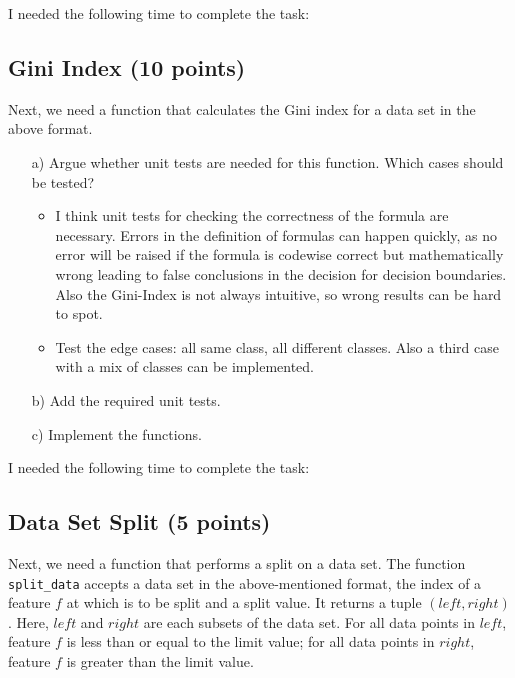 \documentclass{article}
\begin{document}
I needed the following time to complete the task:

\subsection{Gini Index (10 points)}

Next, we need a function that calculates the Gini index for a data set in the above format. 

\begin{enumerate}

\item[a)] Argue whether unit tests are needed for this function. Which cases should be tested?
\begin{itemize}
    \item I think unit tests for checking the correctness of the formula are necessary. Errors in the definition of formulas can happen quickly, as no error will be raised if the formula is codewise correct but mathematically wrong leading to false conclusions in the decision for decision boundaries.
    Also the Gini-Index is not always intuitive, so wrong results can be hard to spot. 
    \item Test the edge cases: all same class, all different classes. Also a third case with a mix of classes can be implemented.
\end{itemize}

\item[b)] Add the required unit tests.

\item[c)] Implement the functions.

\end{enumerate}

I needed the following time to complete the task:

\subsection{Data Set Split (5 points)}

Next, we need a function that performs a split on a data set. The function \texttt{split\_data} accepts a data set in the above-mentioned format, the index of a feature $f$ at which
is to be split and a split value. It returns a tuple $(left, right)$. Here, $left$ and $right$ are each subsets of the data set. For all data points in $left$, feature $f$ is less than or equal to the limit value; for all data points in $right$, feature $f$ is greater than the limit value.
\end{document}
